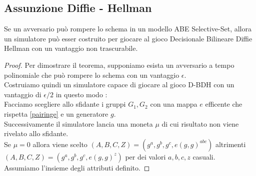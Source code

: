 
\subsection{Assunzione Diffie - Hellman}

\begin{thm}
Se un avversario può rompere lo schema in un modello ABE Selective-Set, allora un simulatore può esser costruito per giocare al gioco Decisionale Bilineare Diffie Hellman con un vantaggio non trascurabile.
\begin{proof}
Per dimostrare il teorema, supponiamo esista un avversario  a tempo polinomiale che può rompere lo schema con un vantaggio $\epsilon$.\\
Costruiamo quindi un simulatore  capace di giocare al gioco D-BDH con un vantaggio di $\epsilon / 2$ in questo modo :\\[0,2cm]

Facciamo scegliere allo sfidante i gruppi $G_1, G_2$ con una mappa $e$ efficente che rispetta \ref{pairinge} e un generatore $g$.\\
Successivamente il simulatore lancia una moneta $\mu$ di cui risultato non viene rivelato allo sfidante.\\
Se $ \mu = 0$ allora viene scelto $(A,B,C,Z) = (g^a,g^b,g^c,e(g,g)^{abc})$ altrimenti $(A,B,C,Z) = (g^a,g^b,g^c, e(g,g)^z)$ per dei valori $a,b,c,z$ casuali.\\
Assumiamo l'insieme degli attributi  definito.


\end{proof}
\end{thm}
